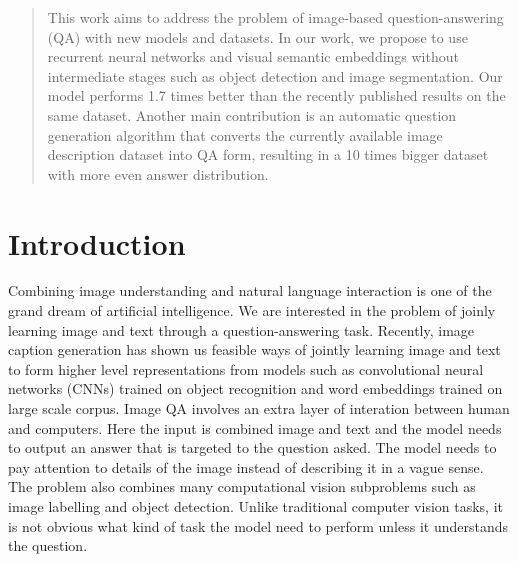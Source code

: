 \documentclass{article}
\renewcommand{\#}[1]{\textbf{#1}}
\begin{document}
 


\begin{abstract}
This work aims to address the problem of image-based question-answering (QA) with new models and datasets. In our work, we propose to use recurrent neural networks and visual semantic embeddings without intermediate stages such as object detection and image segmentation. Our model performs 1.7 times better than the recently published results on the same dataset. Another main contribution is an automatic question generation algorithm that converts the currently available image description dataset into QA form, resulting in a 10 times bigger dataset with more even answer distribution.
\end{abstract}

\section{Introduction}
Combining image understanding and natural language interaction is one of the grand dream of artificial intelligence. We are interested in the problem of joinly learning image and text through a question-answering task. Recently, image caption generation \cite{kiros14b,vinyals14,xu15} has shown us feasible ways of jointly learning image and text to form higher level representations  from models such as convolutional neural networks (CNNs) trained on object recognition and word embeddings trained on large scale corpus. Image QA involves an extra layer of interation between human and computers.  Here the input is combined image and text and the model needs to output an answer that is targeted to the question asked. The model needs to pay attention to details of the image instead of describing it in a vague sense. The problem also combines many computational vision subproblems such as image labelling and object detection. Unlike traditional computer vision tasks, it is not obvious what kind of task the model need to perform unless it understands the question. 
\end{document}
